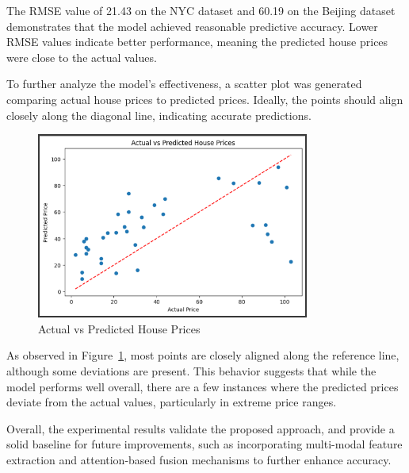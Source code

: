 The RMSE value of 21.43 on the NYC dataset and 60.19 on the Beijing dataset demonstrates that the model achieved reasonable predictive accuracy. Lower RMSE values indicate better performance, meaning the predicted house prices were close to the actual values.

To further analyze the model's effectiveness, a scatter plot was generated comparing actual house prices to predicted prices. Ideally, the points should align closely along the diagonal line, indicating accurate predictions.

\begin{figure}[h]
\centering
\includegraphics[width=0.8\textwidth]{figures/Screenshot_41.png}
\caption{Actual vs Predicted House Prices}
\label{fig:scatter_plot}
\end{figure}

As observed in Figure~\ref{fig:scatter_plot}, most points are closely aligned along the reference line, although some deviations are present. This behavior suggests that while the model performs well overall, there are a few instances where the predicted prices deviate from the actual values, particularly in extreme price ranges.

Overall, the experimental results validate the proposed approach, and provide a solid baseline for future improvements, such as incorporating multi-modal feature extraction and attention-based fusion mechanisms to further enhance accuracy.

